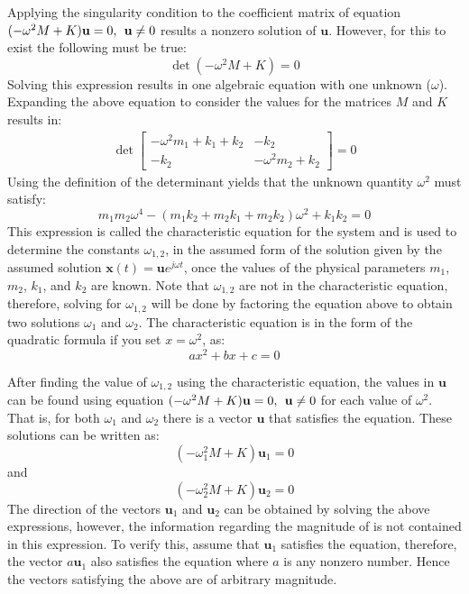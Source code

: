 \documentclass[12pt,letter]{article}
\numberwithin{ex}{section} %
\numberwithin{re}{section} %
\begin{document}
Applying the singularity condition to the coefficient matrix of equation $(-\omega^2 M  + K)\mathbf{u} =0, \hspace{1ex} \mathbf{u}\neq0$ results a nonzero solution of $\mathbf{u}$. However, for this to exist the following must be true:
\begin{equation}
\det(-\omega^2 M  + K) = 0
\end{equation}
Solving this expression results in one algebraic equation with one unknown ($\omega$). Expanding the above equation to consider the values for the matrices $M$ and $K$ results in:
\begin{eqnarray}
\det\begin{bmatrix} -\omega^2 m_1 + k_1 + k_2 & -k_2  \\  -k_2 & -\omega^2 m_2 + k_2 \end{bmatrix}=0
\end{eqnarray}
Using the definition of the determinant yields that the unknown quantity $\omega^2$ must satisfy:
\begin{equation}
m_1 m_2 \omega^4 - (m_1 k_2 + m_2 k_1 + m_2 k_2)\omega^2 + k_1 k_2 = 0
\end{equation}
This expression is called the characteristic equation for the system and is used to determine the constants $\omega_{1,2}$, in the assumed form of the solution given by the assumed solution $\mathbf{x}(t) = \mathbf{u}e^{j\omega t}$, once the values of the physical parameters $m_1$, $m_2$, $k_1$, and $k_2$ are known. Note that $\omega_{1,2}$ are not in the characteristic equation, therefore, solving for $\omega_{1,2}$  will be done by factoring the equation above to obtain two solutions $\omega_1$ and $\omega_2$. The characteristic equation is in the form of the quadratic formula if you set $x=\omega^2$, as:
\begin{equation}
ax^2 + bx +c = 0
\end{equation}

After finding the value of $\omega_{1,2}$ using the characteristic equation, the values in $\mathbf{u}$ can be found using equation $(-\omega^2 M  + K)\mathbf{u} =0, \hspace{1ex} \mathbf{u}\neq0$ for each value of $\omega^2$. That is, for both $\omega_1$ and $\omega_2$ there is a vector  $\mathbf{u}$ that satisfies the equation. These solutions can be written as:
\begin{equation}
	(-\omega_1^2 M  + K)\mathbf{u}_1 =0
\end{equation}
and 
\begin{equation}
	(-\omega_2^2 M  + K)\mathbf{u}_2 =0
\end{equation}
The direction of the vectors $\mathbf{u}_1$ and $\mathbf{u}_2$ can be obtained by solving the above expressions, however, the information regarding the magnitude of is not contained in this expression. To verify this, assume that $\mathbf{u}_1$ satisfies the equation, therefore, the vector $a\mathbf{u}_1$ also satisfies the equation where $a$ is any nonzero number. Hence the vectors satisfying the above are of arbitrary magnitude.
 
\end{document}
